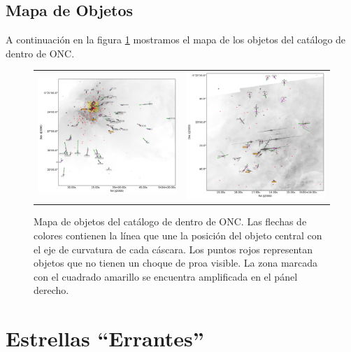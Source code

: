 \subsection{Mapa de Objetos}

A continuación en la figura \ref{fig:orion-map-LL} mostramos el mapa de los objetos del catálogo de \citet{Gutierrez-Soto:2015a} dentro de ONC.

\begin{figure}
  \centering
  \begin{tabular}{cc}
    \includegraphics[width=0.5\linewidth]{./Figures/ll-pos-image-Luis} & \includegraphics[width=0.46\linewidth]{./Figures/ll-pos-image-zoom-Luis}
  \end{tabular}
  \caption{Mapa de objetos del catálogo de \citet{Gutierrez-Soto:2015a} dentro de ONC. Las flechas de colores contienen la línea que une la posición del objeto central con el eje de curvatura de cada cáscara. Los puntos rojos representan objetos que no tienen un choque de proa visible. La zona marcada con el cuadrado amarillo se encuentra amplificada en el pánel derecho.}
  \label{fig:orion-map-LL}
\end{figure}


\section{Estrellas ``Errantes''}
\label{sec:runaway}

